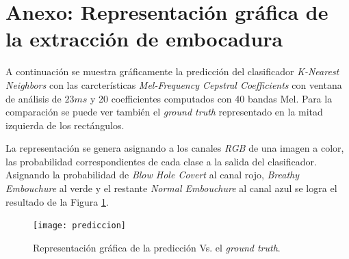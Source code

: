 \documentclass{article}
\begin{document}
\section*{Anexo: Representación gráfica de la extracción de embocadura}

A continuación se muestra gráficamente la predicción del clasificador \textit{K-Nearest Neighbors} con las carcterísticas \textit{Mel-Frequency Cepstral Coefficients} con ventana de análisis de $23ms$ y 20 coefficientes computados con 40 bandas Mel. Para la comparación se puede ver también el \textit{ground truth} representado en la mitad izquierda de los rectángulos.
\medskip

La representación se genera asignando a los canales \textit{RGB} de una imagen a color, las probabilidad correspondientes de cada clase a la salida del clasificador. Asignando la probabilidad de \textit{Blow Hole Covert} al canal rojo, \textit{Breathy Embouchure} al verde y el restante \textit{Normal Embouchure} al canal azul se logra el resultado de la Figura \ref{fig:prediccion}.

\bigskip

\begin{figure}[H]
\begin{center}
\texttt{[image: prediccion]} 
\caption{Representación gráfica de la predicción Vs. el \textit{ground truth}.}
\label{fig:prediccion}
\end{center}
\end{figure}

\newpage




\end{document}
